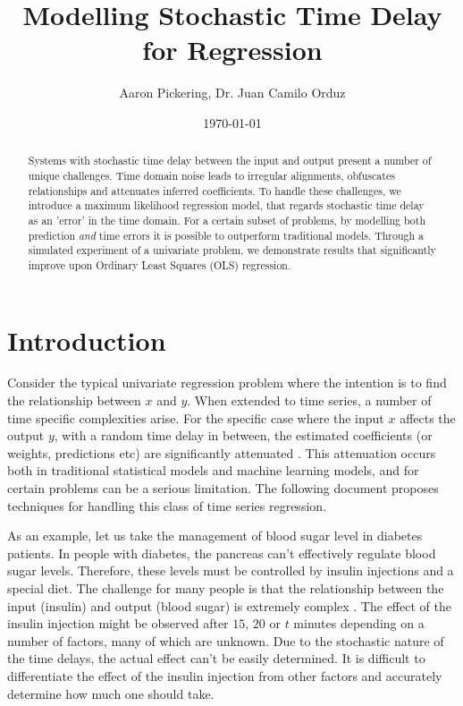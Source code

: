 \documentclass[11pt]{amsart}
\begin{document}
\title{Modelling Stochastic Time Delay for Regression}
\author{Aaron Pickering, Dr. Juan Camilo Orduz}
\date{\today}
\maketitle

\begin{abstract}
Systems with stochastic time delay between the input and output present a number of unique challenges. 
Time domain noise leads to irregular alignments, obfuscates relationships and attenuates inferred coefficients. 
To handle these challenges, we introduce a maximum likelihood regression model, that regards stochastic time delay as an 'error' in the time domain. For a certain subset of problems, by modelling both prediction \emph{and} time errors it is possible to outperform traditional models.
Through a simulated experiment of a univariate problem, we demonstrate results that significantly improve upon Ordinary Least Squares (OLS) regression.
\end{abstract}

\section{Introduction}

Consider the typical univariate regression problem where the intention is to find the relationship between $x$ and $y$. When extended to time series, a number of time specific complexities arise. For the specific case where the input $x$ affects the output $y$, with a random time delay in between, the estimated coefficients (or weights, predictions etc) are significantly attenuated \cite{spearman}. This attenuation occurs both in traditional statistical models and machine learning models, and for certain problems can be a serious limitation. The following document proposes techniques for handling this class of time series regression.

As an example, let us take the management of blood sugar level in diabetes patients. In people with diabetes, the pancreas can't effectively regulate blood sugar levels. Therefore, these levels must be controlled by insulin injections and a special diet. The challenge for many people is that the relationship between the input (insulin) and output (blood sugar) is extremely complex \cite{blood_glucose}. The effect of the insulin injection might be observed after $15$, $20$  or $t$ minutes depending on a number of factors, many of which are unknown. Due to the stochastic nature of the time delays, the actual effect can't be easily determined. It is difficult to differentiate the effect of the insulin injection from other factors and accurately determine how much one should take.
\end{document}
